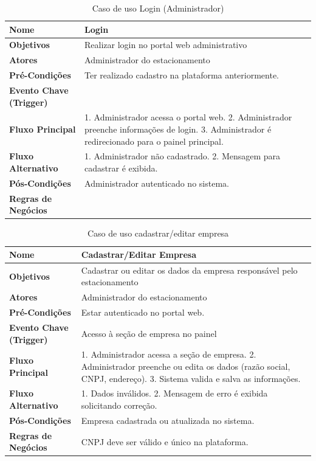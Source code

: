 \begin{table}[H]
\begin{center}
\caption{Caso de uso Login (Administrador)}
\label{tab:caso-uso-login-admin}
\begin{tabular}{|p{4cm}|p{9cm}|}
\hline
\textbf{Nome} & Login \\
\hline
\textbf{Objetivos} & Realizar login no portal web administrativo \\
\hline
\textbf{Atores} & Administrador do estacionamento \\
\hline
\textbf{Pré-Condições} & Ter realizado cadastro na plataforma anteriormente. \\
\hline
\textbf{Evento Chave (Trigger)} & \\
\hline
\textbf{Fluxo Principal} & 1. Administrador acessa o portal web. 2. Administrador preenche informações de login. 3. Administrador é redirecionado para o painel principal. \\
\hline
\textbf{Fluxo Alternativo} & 1. Administrador não cadastrado. 2. Mensagem para cadastrar é exibida. \\
\hline
\textbf{Pós-Condições} & Administrador autenticado no sistema. \\
\hline
\textbf{Regras de Negócios} & \\
\hline
\end{tabular}
\end{center}
\end{table}

\begin{table}[H]
\begin{center}
\caption{Caso de uso cadastrar/editar empresa}
\label{tab:caso-uso-cadastrar-empresa}
\begin{tabular}{|p{4cm}|p{9cm}|}
\hline
\textbf{Nome} & Cadastrar/Editar Empresa \\
\hline
\textbf{Objetivos} & Cadastrar ou editar os dados da empresa responsável pelo estacionamento \\
\hline
\textbf{Atores} & Administrador do estacionamento \\
\hline
\textbf{Pré-Condições} & Estar autenticado no portal web. \\
\hline
\textbf{Evento Chave (Trigger)} & Acesso à seção de empresa no painel \\
\hline
\textbf{Fluxo Principal} & 1. Administrador acessa a seção de empresa. 2. Administrador preenche ou edita os dados (razão social, CNPJ, endereço). 3. Sistema valida e salva as informações. \\
\hline
\textbf{Fluxo Alternativo} & 1. Dados inválidos. 2. Mensagem de erro é exibida solicitando correção. \\
\hline
\textbf{Pós-Condições} & Empresa cadastrada ou atualizada no sistema. \\
\hline
\textbf{Regras de Negócios} & CNPJ deve ser válido e único na plataforma. \\
\hline
\end{tabular}
\end{center}
\end{table}

